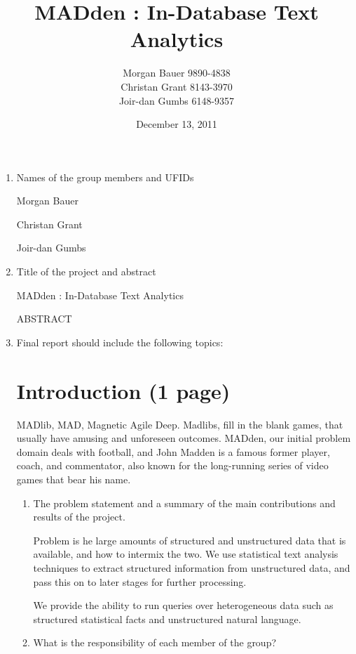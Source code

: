 \documentclass{article}
\title{MADden : In-Database Text Analytics}
\author{Morgan Bauer 9890-4838 \\
  Christan Grant 8143-3970 \\
  Joir-dan Gumbs 6148-9357}
\date{December 13, 2011}
\begin{document}
\maketitle
\begin{enumerate}
\item Names of the group members and UFIDs


  Morgan Bauer

  Christan Grant

  Joir-dan Gumbs

\item Title of the project and abstract

  MADden : In-Database Text Analytics

  ABSTRACT



\item Final report should include the following topics:

  \section{Introduction (1 page)}

  MADlib, MAD, Magnetic Agile Deep.
  Madlibs, fill in the blank games, that usually have amusing and unforeseen outcomes.
  MADden, our initial problem domain deals with football,
  and John Madden is a famous former player, coach, and commentator,
  also known for the long-running series of video games that bear his name.

  \begin{enumerate}
  \item The problem statement and a summary of the main contributions and results of the project.

    Problem is he large amounts of structured and unstructured data that is available, and how to intermix the two.
    We use statistical text analysis techniques to extract structured information from unstructured data,
    and pass this on to later stages for further processing.

    We provide the ability to run queries over heterogeneous data such as structured statistical facts and unstructured natural language.
    

  \item What is the responsibility of each member of the group?




\end{enumerate}
\end{enumerate}
\end{document}
